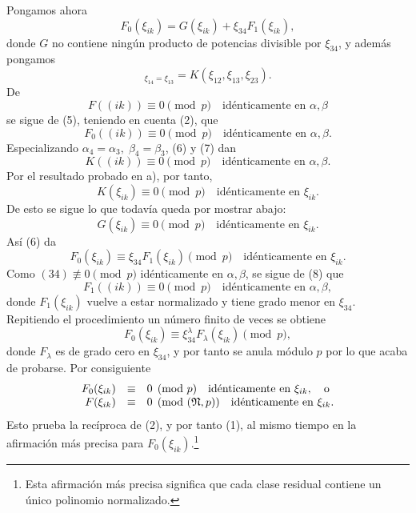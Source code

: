 Pongamos ahora
\begin{equation}
        F_0(\xi_{ik})=G(\xi_{ik})+\xi_{34}F_1(\xi_{ik}),
\end{equation}
donde \(G\) no contiene ningún producto de potencias divisible por \(\xi_{34}\), y además pongamos
\begin{equation}
        [G]_{\xi_{14}=\xi_{13}}=K(\xi_{12},\xi_{13},\xi_{23}).
\end{equation}
De
\[
        F((ik))\equiv0\pmod p\quad \text{idénticamente en \(\alpha,\beta\)}
\]
se sigue de (5), teniendo en cuenta (2), que
\begin{equation}
        F_0((ik))\equiv0\pmod p\quad \text{idénticamente en \(\alpha,\beta\)}.
\end{equation}
Especializando \(\alpha_4=\alpha_3,\;\beta_4=\beta_3\), (6) y (7) dan
\[
        K((ik))\equiv0\pmod p\quad \text{idénticamente en \(\alpha,\beta\)}.
\]
Por el resultado probado en a), por tanto,
\[
        K(\xi_{ik})\equiv0\pmod p\quad \text{idénticamente en \(\xi_{ik}\)}.
\]
De esto se sigue lo que todavía queda por mostrar abajo:
\[
        G(\xi_{ik})\equiv0\pmod p\quad \text{idénticamente en \(\xi_{ik}\)}.
\]
Así (6) da
\[
        F_0(\xi_{ik})\equiv \xi_{34}F_1(\xi_{ik})\pmod p
        \quad \text{idénticamente en \(\xi_{ik}\)}.
\]
Como \((34)\not\equiv0\pmod p\) idénticamente en \(\alpha,\beta\), se sigue de (8) que
\[
        F_1((ik))\equiv0\pmod p\quad \text{idénticamente en \(\alpha,\beta\)},
\]
donde \(F_1(\xi_{ik})\) vuelve a estar normalizado y tiene grado menor en \(\xi_{34}\). Repitiendo el procedimiento un número finito de veces se obtiene
\[
        F_0(\xi_{ik})\equiv\xi_{34}^{\lambda}F_\lambda(\xi_{ik})\pmod p,
\]
donde \(F_\lambda\) es de grado cero en \(\xi_{34}\), y por tanto se anula módulo \(p\) por lo que acaba de probarse. Por consiguiente
\begin{equation}
\begin{array}{rcl}
        F_0(\xi_{ik})&\equiv&0\pmod p\quad \text{idénticamente en \(\xi_{ik}\)},\quad\text{o}\\
        F(\xi_{ik})&\equiv&0\pmod{(\mathfrak N,p)}\quad \text{idénticamente en \(\xi_{ik}\)}.
\end{array}
\end{equation}
Esto prueba la recíproca de (2), y por tanto (1), al mismo tiempo en la afirmación más precisa para \(F_0(\xi_{ik})\).\footnote{Esta afirmación más precisa significa que cada clase residual contiene un único polinomio normalizado.}

